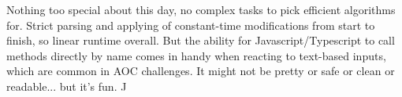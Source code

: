 Nothing too special about this day, no complex tasks to pick efficient algorithms for. Strict parsing and applying of constant-time modifications from start to finish, so linear runtime overall. But the ability for Javascript/Typescript to call methods directly by name comes in handy when reacting to text-based inputs, which are common in AOC challenges. It might not be pretty or safe or clean or readable... but it's fun. ^^